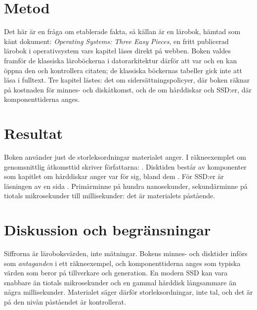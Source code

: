 \section{Metod}
\label{sec:minne-metod}

Det här är en fråga om etablerade fakta, så källan är en lärobok, hämtad
som känt dokument: \emph{Operating Systems: Three Easy Pieces}, en fritt
publicerad lärobok i operativsystem vars kapitel läses direkt på
webben\autocite{ArpaciDusseau2025OSTEP}.  Boken valdes framför de
klassiska läroböckerna i datorarkitektur därför att var och en kan
öppna den och kontrollera citaten; de klassiska böckernas tabeller gick
inte att läsa i fulltext.  Tre kapitel lästes: det om
sidersättningspolicyer, där boken räknar på kostnaden för minnes- och
diskåtkomst, och de om hårddiskar och SSD:er, där komponenttiderna
anges.


\section{Resultat}
\label{sec:minne-resultat}

Boken använder just de storleksordningar materialet anger.  I
räkneexemplet om genomsnittlig åtkomsttid skriver författarna:
.  Disktiden består av
komponenter som kapitlet om hårddiskar anger var för sig, bland dem
.  För SSD:er är läsningen av en sida
.  Primärminne på hundra nanosekunder,
sekundärminne på tiotals mikrosekunder till millisekunder: det är
materialets påstående.

\section{Diskussion och begränsningar}
\label{sec:minne-diskussion}

Siffrorna är läroboksvärden, inte mätningar.  Bokens minnes- och
disktider införs som \emph{antaganden} i ett räkneexempel, och
komponenttiderna anges som typiska värden som beror på tillverkare och
generation.  En modern SSD kan vara snabbare än tiotals mikrosekunder
och en gammal hårddisk långsammare än några millisekunder.  Materialet
säger därför storleksordningar, inte tal, och det är på den nivån
påståendet är kontrollerat.

